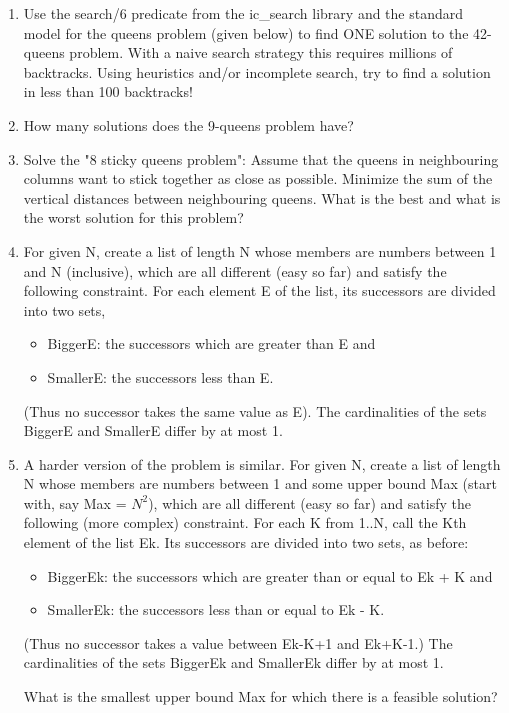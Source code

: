 \begin{enumerate}

\item Use the search/6 predicate from the ic_search library and the
standard model for the queens problem (given below) to find ONE
solution to the 42-queens problem.
With a naive search strategy this requires millions of backtracks.
Using heuristics and/or incomplete search, try to find a solution
in less than 100 backtracks!


\item How many solutions does the 9-queens problem have?


\item Solve the "8 sticky queens problem": Assume that the queens
in neighbouring columns want to stick together as close as possible.
Minimize the sum of the vertical distances between neighbouring queens.
What is the best and what is the worst solution for this problem?


\item For given N, create a list of length N whose members are numbers
between 1 and N (inclusive), which are all different (easy so far) 
and satisfy the following constraint.
For each element E of the list, its successors are divided into two sets,
   \begin{itemize}
   \item BiggerE: the successors which are greater than E and
   \item SmallerE: the successors less than E.
   \end{itemize}
(Thus no successor takes the same value as E).
The cardinalities of the sets BiggerE and SmallerE differ by at most 1. 


\item A harder version of the problem is similar.
For given N, create a list of length N whose members are numbers
between 1 and some upper bound Max (start with, say Max = $N^2$), 
which are all different (easy so far) 
and satisfy the following (more complex) constraint.
For each K from 1..N, call the Kth element of the list Ek. 
Its successors are divided into two sets, as before:
   \begin{itemize}
   \item BiggerEk: the successors which are greater than or equal to Ek + K and
   \item SmallerEk: the successors less than or equal to Ek - K.
   \end{itemize}
(Thus no successor takes a value between Ek-K+1 and Ek+K-1.)
The cardinalities of the sets BiggerEk and SmallerEk differ 
by at most 1. 

What is the smallest upper bound Max for which there is a feasible solution?

\end{enumerate}

